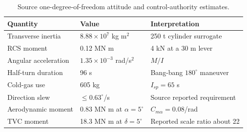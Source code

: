 \begin{table}[htbp]
\caption{Source one-degree-of-freedom attitude and control-authority estimates.}
\label{tab:src11}
\small
\setlength{\tabcolsep}{3.5pt}
\begin{tabularx}{\linewidth}{@{}p{.28\linewidth}p{.32\linewidth}X@{}}
\toprule
Quantity & Value & Interpretation \\
\midrule
Transverse inertia & $8.88\times10^7$ kg m$^2$ & 250 t cylinder surrogate \\
RCS moment & 0.12 MN m & 4 kN at a 30 m lever \\
Angular acceleration & $1.35\times10^{-3}$ rad/s$^2$ & $M/I$ \\
Half-turn duration & 96 s & Bang-bang $180^\circ$ maneuver \\
Cold-gas use & 605 kg & $I_{sp}=65$ s \\
Direction slew & $\le0.63^\circ$/s & Source reported requirement \\
Aerodynamic moment & 0.83 MN m at $\alpha=5^\circ$ & $C_{m\alpha}=0.08$/rad \\
TVC moment & 18.3 MN m at $\delta=5^\circ$ & Reported scale ratio about 22 \\
\bottomrule
\end{tabularx}
\end{table}
